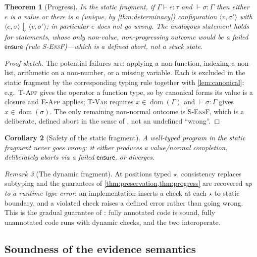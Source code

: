 \documentclass[11pt,a4paper]{article}
\theoremstyle{plain}
\newtheorem{theorem}{Theorem}[section]
\newtheorem{corollary}[theorem]{Corollary}
\theoremstyle{definition}
\theoremstyle{remark}
\newtheorem{remark}[theorem]{Remark}
\newcommand{\rn}[1]{\textsc{#1}}                          %
\DeclareMathOperator{\dom}{dom}                           %
\newcommand{\evalto}{\Downarrow}
\newcommand{\env}{\sigma}
\newcommand{\dyn}{\star}                                  %
\newcommand{\Gam}{\Gamma}
\begin{document}
\begin{theorem}[Progress]
\label{thm:progress}
In the static fragment, if $\Gam\vdash e:\tau$ and $\vdash\env:\Gam$ then either
$e$ is a value or there is a (unique, by \cref{thm:determinacy}) configuration
$\langle v,\env'\rangle$ with $\langle e,\env\rangle\evalto\langle v,\env'
\rangle$; in particular $e$ does not go wrong. The analogous statement holds for
statements, whose only non-value, non-progressing outcome would be a failed
$\mathsf{ensure}$ (rule \rn{S-EnsF})---which is a \emph{defined} abort, not a
stuck state.
\end{theorem}
\begin{proof}[Proof sketch]
The potential failures are: applying a non-function, indexing a non-list,
arithmetic on a non-number, or a missing variable. Each is excluded in the
static fragment by the corresponding typing rule together with
\cref{lem:canonical}: e.g.\ \rn{T-App} gives the operator a function type, so by
canonical forms its value is a closure and \rn{E-App} applies; \rn{T-Var}
requires $x\in\dom(\Gam)$ and $\vdash\env:\Gam$ gives $x\in\dom(\env)$. The only
remaining non-normal outcome is \rn{S-EnsF}, which is a deliberate, defined
abort in the sense of \citet{hoare1969}, not an undefined ``wrong''.
\end{proof}

\begin{corollary}[Safety of the static fragment]
A well-typed program in the static fragment never goes wrong: it either
produces a value/normal completion, deliberately aborts via a failed
$\mathsf{ensure}$, or diverges.
\end{corollary}

\begin{remark}[The dynamic fragment]
At positions typed $\dyn$, consistency replaces subtyping and the guarantees of
\cref{thm:preservation,thm:progress} are recovered \emph{up to a runtime type
error}: an implementation inserts a check at each $\dyn$-to-static boundary, and
a violated check raises a defined error rather than going wrong. This is the
gradual guarantee of \citet{siek2006}: fully annotated code is sound, fully
unannotated code runs with dynamic checks, and the two interoperate.
\end{remark}

\subsection{Soundness of the evidence semantics}
\end{document}
